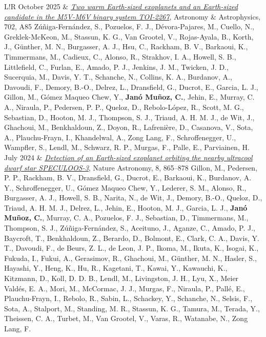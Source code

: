 \documentclass{article}
\newcommand{\me}{\textbf{Janó Muñoz, C.}}
\newcommand{\authlist}[1]{{\footnotesize #1}}
\begin{document}
\begin{longtable}{L!{\vrule}R}
    October 2025 &
    \href{https://ui.adsabs.harvard.edu/abs/2025A%26A...702A..85Z/abstract}{\textit{Two warm Earth-sized exoplanets and an Earth-sized candidate in the M5V-M6V binary system TOI-2267}},
    Astronomy \& Astrophysics, 702, A85 \newline
    \authlist{Zúñiga-Fernández, S., Pozuelos, F. J., Dévora-Pajares, M., Cuello, N., Greklek-McKeon, M., Stassun, K. G., Van Grootel, V., Rojas-Ayala, B., Korth, J., Günther, M. N., Burgasser, A. J., Hsu, C., Rackham, B. V., Barkaoui, K., Timmermans, M., Cadieux, C., Alonso, R., Strakhov, I. A., Howell, S. B., Littlefield, C., Furlan, E., Amado, P. J., Jenkins, J. M., Twicken, J. D., Sucerquia, M., Davis, Y. T., Schanche, N., Collins, K. A., Burdanov, A., Davoudi, F., Demory, B.-O., Delrez, L., Dransfield, G., Ducrot, E., Garcia, L. J., Gillon, M., Gómez Maqueo Chew, Y., \me, Jehin, E., Murray, C. A., Niraula, P., Pedersen, P. P., Queloz, D., Rebolo-López, R., Scott, M. G., Sebastian, D., Hooton, M. J., Thompson, S. J., Triaud, A. H. M. J., de Wit, J., Ghachoui, M., Benkhaldoun, Z., Doyon, R., Lafrenière, D., Casanova, V., Sota, A., Plauchu-Frayn, I., Khandelwal, A., Zong Lang, F., Schroffenegger, U., Wampfler, S., Lendl, M., Schwarz, R. P., Murgas, F., Palle, E., Parviainen, H.} \\

    July 2024 &
    \href{https://ui.adsabs.harvard.edu/abs/2024NatAs...8..865G/abstract}{\textit{Detection of an Earth-sized exoplanet orbiting the nearby ultracool dwarf star SPECULOOS-3}},
    Nature Astronomy, 8, 865--878 \newline
    \authlist{Gillon, M., Pedersen, P. P., Rackham, B. V., Dransfield, G., Ducrot, E., Barkaoui, K., Burdanov, A. Y., Schroffenegger, U., Gómez Maqueo Chew, Y., Lederer, S. M., Alonso, R., Burgasser, A. J., Howell, S. B., Narita, N., de Wit, J., Demory, B.-O., Queloz, D., Triaud, A. H. M. J., Delrez, L., Jehin, E., Hooton, M. J., Garcia, L. J., \me, Murray, C. A., Pozuelos, F. J., Sebastian, D., Timmermans, M., Thompson, S. J., Zúñiga-Fernández, S., Aceituno, J., Aganze, C., Amado, P. J., Baycroft, T., Benkhaldoun, Z., Berardo, D., Bolmont, E., Clark, C. A., Davis, Y. T., Davoudi, F., de Beurs, Z. L., de Leon, J. P., Ikoma, M., Ikuta, K., Isogai, K., Fukuda, I., Fukui, A., Gerasimov, R., Ghachoui, M., Günther, M. N., Hasler, S., Hayashi, Y., Heng, K., Hu, R., Kagetani, T., Kawai, Y., Kawauchi, K., Kitzmann, D., Koll, D. D. B., Lendl, M., Livingston, J. H., Lyu, X., Meier Valdés, E. A., Mori, M., McCormac, J. J., Murgas, F., Niraula, P., Pallé, E., Plauchu-Frayn, I., Rebolo, R., Sabin, L., Schackey, Y., Schanche, N., Selsis, F., Sota, A., Stalport, M., Standing, M. R., Stassun, K. G., Tamura, M., Terada, Y., Theissen, C. A., Turbet, M., Van Grootel, V., Varas, R., Watanabe, N., Zong Lang, F.} \\


\end{longtable}
\end{document}
